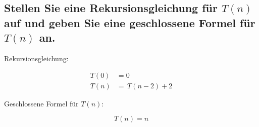 \documentclass{article}
\begin{document}
\subsection{Stellen Sie eine Rekursionsgleichung für $T(n)$ auf und geben Sie eine geschlossene Formel für $T(n)$ an.}

Rekursionsgleichung:

\begin{align*}
	T(0) & = 0               \\
	T(n) & = \, T(n - 2) + 2
\end{align*}

\vspace{1em}

\begin{flushleft}
	Geschlossene Formel für $T(n)$:
\end{flushleft}

$$T(n) = n$$
\end{document}
